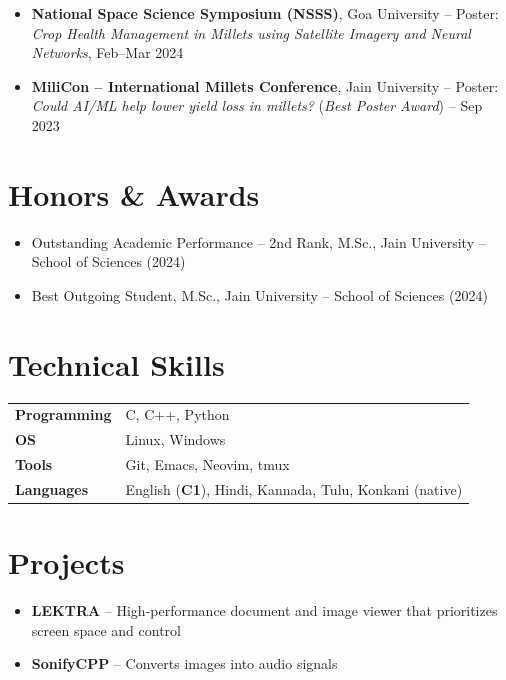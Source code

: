 \documentclass[10.5pt,a4paper]{article}
\begin{document}
\begin{itemize}[leftmargin=1.2em]
    \item \textbf{National Space Science Symposium (NSSS)}, Goa University -- Poster: \textit{Crop Health Management in Millets using Satellite Imagery and Neural Networks}, Feb--Mar 2024
    \item \textbf{MiliCon -- International Millets Conference}, Jain University -- Poster: \textit{Could AI/ML help lower yield loss in millets?} (\textit{Best Poster Award}) -- Sep 2023
\end{itemize}

\section*{Honors \& Awards}

\begin{itemize}[leftmargin=1.2em]
    \item Outstanding Academic Performance -- 2nd Rank, M.Sc., Jain University -- School of Sciences (2024)
    \item Best Outgoing Student, M.Sc., Jain University -- School of Sciences (2024)
\end{itemize}

\section*{Technical Skills}

\begin{tabularx}{\linewidth}{@{}l X@{}}
    \textbf{Programming} & C, C++, Python \\[0.3em]
    \textbf{OS} & Linux, Windows \\[0.3em]
    \textbf{Tools} & Git, Emacs, Neovim, tmux \\[0.3em]
    \textbf{Languages} & English (\textbf{C1}), Hindi, Kannada, Tulu, Konkani (native)
\end{tabularx}

\section*{Projects}

\begin{itemize}[leftmargin=1.2em]
    \item \textbf{LEKTRA} -- High-performance document and image viewer that prioritizes screen space and control
    \item \textbf{SonifyCPP} -- Converts images into audio signals
\end{itemize}
\end{document}
